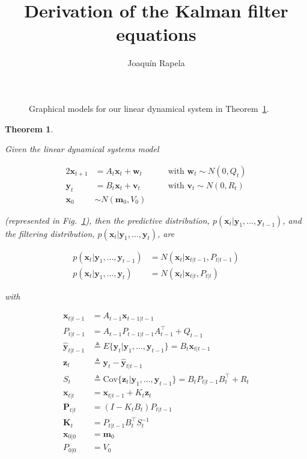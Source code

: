 \documentclass[12pt]{article}
\title{Derivation of the Kalman filter equations}
\author{Joaquín Rapela}
\newtheorem{theorem}{Theorem}
\begin{document}
\maketitle

\begin{figure}[h]
    \centering
    
    \caption{Graphical models for our linear dynamical system in
    Theorem~\ref{thm:kalmanFilterEqs}.}
    \label{fig:ldsModel}
\end{figure}

\begin{theorem}
	\label{thm:kalmanFilterEqs}

    Given the linear dynamical systems model

    \begin{alignat*}{2}
        \mathbf{x}_{t+1}&=A_t\mathbf{x}_t+\mathbf{w}_t&\quad&\text{with }\mathbf{w}_t\sim N(0,Q_t)\\
        \mathbf{y}_t&=B_t\mathbf{x}_t+\mathbf{v}_t&&\text{with }\mathbf{v}_t\sim N(0,R_t)\\
        \mathbf{x}_0&\sim N(\mathbf{m}_0,V_0)&&
    \end{alignat*}

    \noindent (represented in Fig.~\ref{fig:ldsModel}), then the predictive
    distribution, $p(\mathbf{x}_t|\mathbf{y}_1,\ldots,\mathbf{y}_{t-1})$, and
    the filtering distribution,
    $p(\mathbf{x}_t|\mathbf{y}_1,\ldots,\mathbf{y}_t)$, are

    \begin{align*}
        p(\mathbf{x}_t|\mathbf{y}_1,\ldots,\mathbf{y}_{t-1})&=N(\mathbf{x}_t|\mathbf{x}_{t|t-1},P_{t|t-1})\\
        p(\mathbf{x}_t|\mathbf{y}_1,\ldots,\mathbf{y}_t)&=N(\mathbf{x}_t|\mathbf{x}_{t|t},P_{t|t})
    \end{align*}

    \noindent with

    \begin{align}
        \mathbf{x}_{t|t-1}&=A_{t-1}\mathbf{x}_{t-1|t-1}\label{eq:xtGtm1}\\
        P_{t|t-1}&=A_{t-1}P_{t-1|t-1}A_{t-1}^\intercal+Q_{t-1}\label{eq:PtGtm1}\\
        \hat{\mathbf{y}}_{t|t-1}&\triangleq E\{\mathbf{y}_t|\mathbf{y}_1,\ldots,\mathbf{y}_{t-1}\}=B_t\mathbf{x}_{t|t-1}\label{eq:ytGtm1}\\
        \mathbf{z}_t&\triangleq\mathbf{y}_t-\hat{\mathbf{y}}_{t|t-1}\nonumber\\
        S_t&\triangleq \text{Cov}\{\mathbf{z}_t|\mathbf{y}_1,\ldots,\mathbf{y}_{t-1}\}=B_tP_{t|t-1}B_t^\intercal+R_t\label{eq:St}\\
        \mathbf{x}_{t|t}&=\mathbf{x}_{t|t-1}+K_t\mathbf{z}_t\label{eq:xtGt}\\
        \mathbf{P}_{t|t}&=(I-K_tB_t)P_{t|t-1}\label{eq:PtGt}\\
        \mathbf{K}_t&=P_{t|t-1}B_t^\intercal S_t^{-1}\label{eq:Kt}\\
        \mathbf{x}_{0|0}&=\mathbf{m}_0\label{eq:x0G0}\\
        P_{0|0}&=V_0\label{eq:P0G0}
    \end{align}
\end{theorem}
\end{document}
